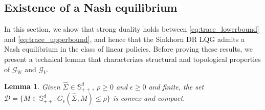 \documentclass[letterpaper, 10 pt, conference]{ieeeconf}  %
\theoremstyle{ieeeconf}
\newtheorem{lemma}{Lemma}
\newcommand{\Symm}{\mathbb{S}}
\begin{document}
\subsection{Existence of a Nash equilibrium}
In this section, we show that strong duality holds between \eqref{eq:trace_lowerbound} and \eqref{eq:trace_upperbound}, and hence that the Sinkhorn DR LQG admits a Nash equilibrium in the class of linear policies. Before proving these results, we present a technical lemma that characterizes structural and
topological properties of $\mathcal{G}_W$ and $\mathcal{G}_V$.
\begin{lemma}
    \label{lemma:compactness}
    Given $\hat{\Sigma}\in\Symm^d_{++}$, $\rho\geq 0$ and $\epsilon \geq 0$ and finite, the set $\mathcal{D} = \{M \in\Symm^d_{++} : G_\epsilon(\hat{\Sigma},M) \leq \rho\}$ is convex and compact.
\end{lemma}
\end{document}
